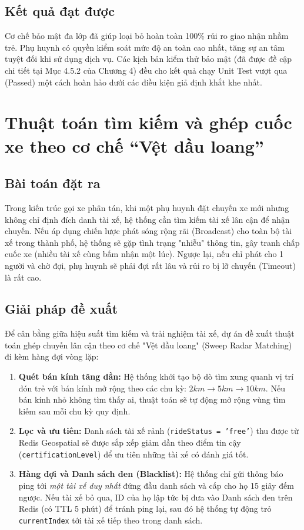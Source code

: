 \documentclass[../DoAn.tex]{subfiles}
\begin{document}
\subsection{Kết quả đạt được}
Cơ chế bảo mật đa lớp đã giúp loại bỏ hoàn toàn 100\% rủi ro giao nhận nhầm trẻ. Phụ huynh có quyền kiểm soát mức độ an toàn cao nhất, tăng sự an tâm tuyệt đối khi sử dụng dịch vụ. Các kịch bản kiểm thử bảo mật (đã được đề cập chi tiết tại Mục 4.5.2 của Chương 4) đều cho kết quả chạy Unit Test vượt qua (Passed) một cách hoàn hảo dưới các điều kiện giả định khắt khe nhất.

\section{Thuật toán tìm kiếm và ghép cuốc xe theo cơ chế ``Vệt dầu loang''}
\subsection{Bài toán đặt ra}
Trong kiến trúc gọi xe phân tán, khi một phụ huynh đặt chuyến xe mới nhưng không chỉ định đích danh tài xế, hệ thống cần tìm kiếm tài xế lân cận để nhận chuyến. Nếu áp dụng chiến lược phát sóng rộng rãi (Broadcast) cho toàn bộ tài xế trong thành phố, hệ thống sẽ gặp tình trạng "nhiễu" thông tin, gây tranh chấp cuốc xe (nhiều tài xế cùng bấm nhận một lúc). Ngược lại, nếu chỉ phát cho 1 người và chờ đợi, phụ huynh sẽ phải đợi rất lâu và rủi ro bị lỡ chuyến (Timeout) là rất cao.

\subsection{Giải pháp đề xuất}
Để cân bằng giữa hiệu suất tìm kiếm và trải nghiệm tài xế, dự án đề xuất thuật toán ghép chuyến lân cận theo cơ chế "Vệt dầu loang" (Sweep Radar Matching) đi kèm hàng đợi vòng lặp:
\begin{enumerate}
    \item \textbf{Quét bán kính tăng dần:} Hệ thống khởi tạo bộ dò tìm xung quanh vị trí đón trẻ với bán kính mở rộng theo các chu kỳ: $2km \rightarrow 5km \rightarrow 10km$. Nếu bán kính nhỏ không tìm thấy ai, thuật toán sẽ tự động mở rộng vùng tìm kiếm sau mỗi chu kỳ quy định.
    \item \textbf{Lọc và ưu tiên:} Danh sách tài xế rảnh (\texttt{rideStatus = 'free'}) thu được từ Redis Geospatial sẽ được sắp xếp giảm dần theo điểm tin cậy (\texttt{certificationLevel}) để ưu tiên những tài xế có đánh giá tốt.
    \item \textbf{Hàng đợi và Danh sách đen (Blacklist):} Hệ thống chỉ gửi thông báo ping tới \textit{một tài xế duy nhất} đứng đầu danh sách và cấp cho họ 15 giây đếm ngược. Nếu tài xế bỏ qua, ID của họ lập tức bị đưa vào Danh sách đen trên Redis (có TTL 5 phút) để tránh ping lại, sau đó hệ thống tự động trỏ \texttt{currentIndex} tới tài xế tiếp theo trong danh sách.
\end{enumerate}
\end{document}
